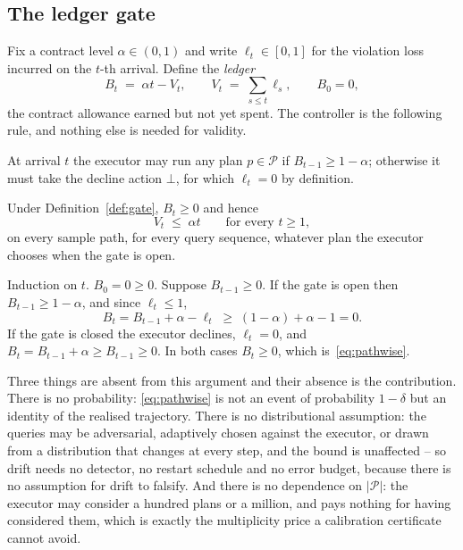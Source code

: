 \subsection{The ledger gate}
\label{sec:gate}

Fix a contract level $\alpha \in (0,1)$ and write $\ell_t \in [0,1]$ for
the violation loss incurred on the $t$-th arrival. Define the
\emph{ledger}
\begin{equation}
\label{eq:ledger}
B_t \;=\; \alpha t - V_t ,
\qquad V_t \;=\; \sum_{s\le t} \ell_s ,
\qquad B_0 = 0 ,
\end{equation}
the contract allowance earned but not yet spent. The controller is the
following rule, and nothing else is needed for validity.

\begin{definition}
\label{def:gate}
At arrival $t$ the executor may run any plan $p \in \mathcal{P}$ if
$B_{t-1} \ge 1 - \alpha$; otherwise it must take the decline action
$\bot$, for which $\ell_t = 0$ by definition.
\end{definition}

\begin{theorem}
\label{thm:gate}
Under Definition~\ref{def:gate}, $B_t \ge 0$ and hence
\begin{equation}
\label{eq:pathwise}
V_t \;\le\; \alpha t
\qquad\text{for every } t \ge 1 ,
\end{equation}
on every sample path, for every query sequence, whatever plan the
executor chooses when the gate is open.
\end{theorem}

\begin{pf}
Induction on $t$. $B_0 = 0 \ge 0$. Suppose $B_{t-1}\ge 0$. If the gate
is open then $B_{t-1} \ge 1-\alpha$, and since $\ell_t \le 1$,
\[
B_t = B_{t-1} + \alpha - \ell_t \;\ge\; (1-\alpha) + \alpha - 1 = 0 .
\]
If the gate is closed the executor declines, $\ell_t = 0$, and
$B_t = B_{t-1} + \alpha \ge B_{t-1} \ge 0$. In both cases
$B_t \ge 0$, which is~\eqref{eq:pathwise}.
\end{pf}

Three things are absent from this argument and their absence is the
contribution. There is no probability: \eqref{eq:pathwise} is not an
event of probability $1-\delta$ but an identity of the realised
trajectory. There is no distributional assumption: the queries may be
adversarial, adaptively chosen against the executor, or drawn from a
distribution that changes at every step, and the bound is unaffected --
so drift needs no detector, no restart schedule and no error budget,
because there is no assumption for drift to falsify. And there is no
dependence on $|\mathcal{P}|$: the executor may consider a hundred
plans or a million, and pays nothing for having considered them, which
is exactly the multiplicity price a calibration certificate cannot
avoid.

